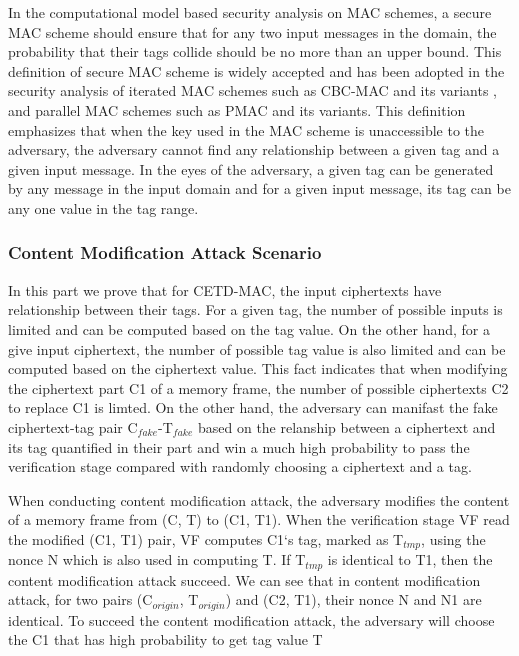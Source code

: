 In the computational model based security analysis on MAC schemes, a secure MAC scheme should ensure that for any two input messages in the domain, the probability that their tags collide should be no more than an upper bound. This definition of secure MAC scheme is widely accepted and has been adopted in the security analysis of iterated MAC schemes such as CBC-MAC \cite{} and its variants \cite{}, and parallel MAC schemes such as PMAC \cite{} and its variants\cite{}. This definition emphasizes that when the key used in the MAC scheme is unaccessible to the adversary, the adversary cannot find any relationship between a given tag and a given input message. In the eyes of the adversary, a given tag can be generated by any message in the input domain and for a given input message, its tag can be any one value in the tag range. 
\subsubsection{Content Modification Attack Scenario}
In this part we prove that for CETD-MAC, the input ciphertexts have relationship between their tags.  For a given tag, the number of possible inputs is limited and can be computed based on the tag value. On the other hand, for a give input ciphertext, the number of possible tag value is also limited and can be computed based on the ciphertext value. This fact indicates that when modifying the ciphertext part C1 of a memory frame, the number of possible ciphertexts C2 to replace C1 is limted. On the other hand, the adversary can manifast the fake ciphertext-tag pair C$_{fake}$-T$_{fake}$ based on the relanship between a ciphertext and its tag quantified in their part and win a much high probability to pass the verification stage compared with randomly choosing a ciphertext and a tag. 

When conducting content modification attack, the adversary modifies the content of a memory frame from (C, T) to (C1, T1). When the verification stage VF read the modified (C1, T1) pair, VF computes C1`s tag, marked as T$_{tmp}$, using the nonce N which is also used in computing T. If T$_{tmp}$ is identical to T1, then the content modification attack succeed. We can see that in content modification attack, for two pairs (C$_{origin}$, T$_{origin}$) and (C2, T1), their nonce N and N1 are identical. To succeed the content modification attack, the adversary will choose the C1 that has high probability to get tag value T    
